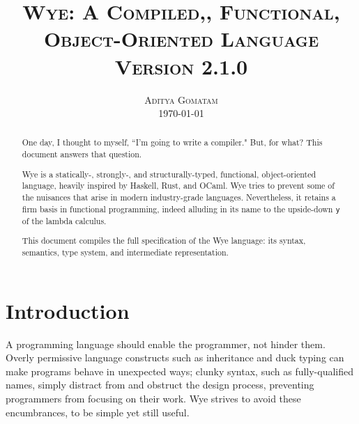 \documentclass[a4paper, 12pt]{article}
\newcommand{\version}{2.1.0}
\begin{document}
\title{
\textsc{Wye: A Compiled,, Functional, Object-Oriented Language} \\
\vspace{2ex}
\large{\textsc{Version \version}}\\
\vspace{2ex}
}
\author{\normalsize\textsc{Aditya Gomatam} \\ 
\normalsize{\today\vspace{2ex}}}
\date{}
\maketitle


\begin{abstract}
One day, I thought to myself, ``I'm going to write a compiler." But, for what?
This document answers that question.

Wye is a statically-, strongly-, and structurally-typed, functional, object-oriented language,
heavily inspired by Haskell, Rust, and OCaml. Wye tries to prevent some of the nuisances
that arise in modern industry-grade languages. Nevertheless, it retains a firm basis in functional
programming, indeed alluding in its name to the upside-down \texttt{y} of the lambda calculus.

This document compiles the full specification of the Wye language: its syntax, semantics,
type system, and intermediate representation.
\end{abstract}






\section{Introduction}
A programming language should enable the programmer, not hinder them. Overly permissive
language constructs such as inheritance and duck typing can make programs behave in
unexpected ways; clunky syntax, such as fully-qualified names, simply distract from and obstruct the
design process, preventing programmers from focusing on their work. Wye strives to avoid these
encumbrances, to be simple yet still useful.
\end{document}
